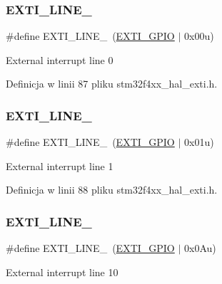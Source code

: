 \subsubsection{\texorpdfstring{E\+X\+T\+I\+\_\+\+L\+I\+N\+E\+\_}{EXTI\_LINE\_0}}
{\footnotesize\ttfamily \#define E\+X\+T\+I\+\_\+\+L\+I\+N\+E\+\_~(\hyperlink{group___e_x_t_i___private___constants_gacfa322960fc87db022536119cabb4d2a}{E\+X\+T\+I\+\_\+\+G\+P\+IO}       $\vert$ 0x00u)}

External interrupt line 0 

Definicja w linii 87 pliku stm32f4xx\+\_\+hal\+\_\+exti.\+h.

\mbox{\label{group___e_x_t_i___line_gaf64b8deca0cf44b4c58d2b4d0fcd2177}} 
\subsubsection{\texorpdfstring{E\+X\+T\+I\+\_\+\+L\+I\+N\+E\+\_}{EXTI\_LINE\_1}}
{\footnotesize\ttfamily \#define E\+X\+T\+I\+\_\+\+L\+I\+N\+E\+\_~(\hyperlink{group___e_x_t_i___private___constants_gacfa322960fc87db022536119cabb4d2a}{E\+X\+T\+I\+\_\+\+G\+P\+IO}       $\vert$ 0x01u)}

External interrupt line 1 

Definicja w linii 88 pliku stm32f4xx\+\_\+hal\+\_\+exti.\+h.

\mbox{\label{group___e_x_t_i___line_gac94dbc4ff94b573f4dd796d60dcd250c}} 
\subsubsection{\texorpdfstring{E\+X\+T\+I\+\_\+\+L\+I\+N\+E\+\_}{EXTI\_LINE\_10}}
{\footnotesize\ttfamily \#define E\+X\+T\+I\+\_\+\+L\+I\+N\+E\+\_~(\hyperlink{group___e_x_t_i___private___constants_gacfa322960fc87db022536119cabb4d2a}{E\+X\+T\+I\+\_\+\+G\+P\+IO}       $\vert$ 0x0\+Au)}

External interrupt line 10 

